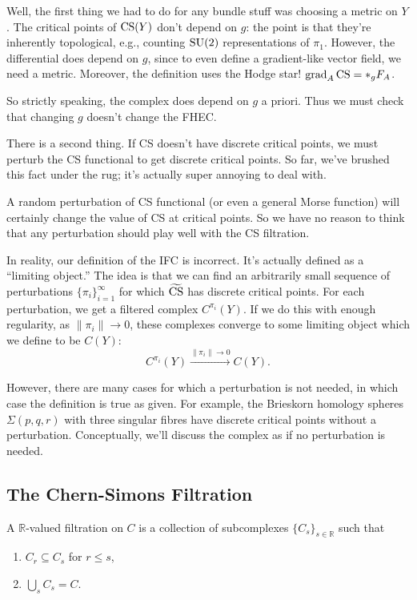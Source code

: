 \documentclass[main]{subfiles}
\begin{document}
Well, the first thing we had to do for any bundle stuff was choosing a metric on $Y$. The critical points of $\operatorname{CS}(Y)$ don't depend on $g$: the point is that they're inherently topological, e.g., counting $\operatorname{SU}(2)$ representations of $\pi_1$. However, the differential does depend on $g$, since to even define a gradient-like vector field, we need a metric. Moreover, the definition uses the Hodge star! $\operatorname{grad}_A\operatorname{CS} = \ast_g F_A$.

So strictly speaking, the complex does depend on $g$ a priori. Thus we must check that changing $g$ doesn't change the FHEC.

There is a second thing. If CS doesn't have discrete critical points, we must perturb the CS functional to get discrete critical points. So far, we've brushed this fact under the rug; it's actually super annoying to deal with.

A random perturbation of CS functional (or even a general Morse function) will certainly change the value of CS at critical points. So we have no reason to think that any perturbation should play well with the CS filtration.

In reality, our definition of the IFC is incorrect. It's actually defined as a ``limiting object.'' The idea is that we can find an arbitrarily small sequence of perturbations $\{\pi_i\}_{i=1}^\infty$ for which $\widetilde{\operatorname{CS}}$ has discrete critical points. For each perturbation, we get a filtered complex $C^{\pi_i}(Y)$. If we do this with enough regularity, as $\|\pi_i\|\to 0$, these complexes converge to some limiting object which we define to be $C(Y)$:
\[
C^{\pi_i}(Y) \xrightarrow{\|\pi_i\|\to 0} C(Y).
\]

However, there are many cases for which a perturbation is not needed, in which case the definition is true as given. For example, the Brieskorn homology spheres $\Sigma(p,q,r)$ with three singular fibres have discrete critical points without a perturbation. Conceptually, we'll discuss the complex as if no perturbation is needed.

\subsection*{The Chern-Simons Filtration}

\begin{definition}
A $\mathbb{R}$-valued filtration on $C$ is a collection of subcomplexes $\{C_s\}_{s\in\mathbb{R}}$ such that
\begin{enumerate}
\item $C_r \subseteq C_s$ for $r\leq s$,
\item $\displaystyle\bigcup_s C_s = C$.
\end{enumerate}
\end{definition}
\end{document}
